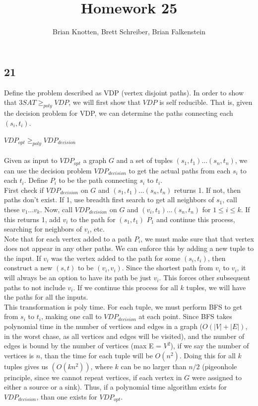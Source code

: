 \documentclass[letterpaper,notitlepage,twoside]{article}
\begin{document}
\title{Homework 25}
\author{Brian Knotten, Brett Schreiber, Brian Falkenstein}
\maketitle
\subsection*{21}
Define the problem described as VDP (vertex disjoint paths). In order to show that $3SAT \geq _{poly} VDP$, we will first show that $VDP$ is self reducible. That is, given the decision problem for VDP, we can determine the paths connecting each $(s_i, t_i)$. \\\\
$VDP_{opt} \geq _{poly} VDP_{decision}$\\\\
Given as input to $VDP_{opt}$ a graph $G$ and a set of tuples $(s_1, t_1) ... (s_n, t_n)$, we can use the decision problem $VDP_{decision}$ to get the actual paths from each $s_i$ to each $t_i$. Define $P_i$ to be the path connecting $s_i$ to $t_i$. \\
First check if $VDP_{decision}$ on $G$ and $(s_1, t_1) ... (s_n, t_n)$ returns 1. If not, then paths don't exist. If 1, use breadth first search to get all neighbors of $s_1$, call these $v_1...v_k$. Now, call $VDP_{decision}$ on $G$ and $(v_i, t_1) ... (s_n, t_n)$ for $1\leq i \leq k$. If this returns 1, add $v_i$ to the path for $(s_1, t_1)$ $P_1$ and continue this process, searching for neighbors of $v_i$, etc. \\
Note that for each vertex added to a path $P_i$, we must make sure that that vertex does not appear in any other paths. We can enforce this by adding a new tuple to the input. If $v_i$ was the vertex added to the path for some $(s_i, t_i)$, then construct a new $(s, t)$ to be $(v_i, v_i)$. Since the shortest path from $v_i$ to $v_i$, it will always be an option to have its path be just $v_i$. This forces other subsequent paths to not include $v_i$. If we continue this process for all $k$ tuples, we will have the paths for all the inputs. \\
This transformation is poly time. For each tuple, we must perform BFS to get from $s_i$ to $t_i$, making one call to $VDP_{decision}$ at each point. Since BFS takes polynomial time in the number of vertices and edges in a graph ($O(|V| + |E|)$, in the worst chase, as all vertices and edges will be visited), and the number of edges is bound by the number of vertices (max E = $V^2$), if we say the number of vertices is $n$, than the time for each tuple will be $O(n^2)$. Doing this for all $k$ tuples gives us $(O(kn^2))$, where $k$ can be no larger than $n/2$ (pigeonhole principle, since we cannot repeat vertices, if each vertex in $G$ were assigned to either a source or a sink). Thus, if a polynomial time algorithm exists for $VDP_{decision}$, than one exists for $VDP_{opt}$. \\\\
\end{document}

